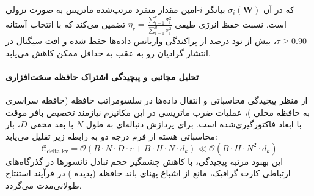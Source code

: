 که در آن $\sigma_i(\mathbf{W})$ بیانگر $i$-امین مقدار منفرد مرتب‌شده ماتریس به صورت نزولی است. نسبت حفظ انرژی طیفی $\eta_r = \frac{\sum_{i=1}^r \sigma_i^2}{\sum_{i=1}^{d} \sigma_i^2}$ تضمین می‌کند که با انتخاب آستانه $\tau \ge 0.90$، بیش از نود درصد از پراکندگی واریانس داده‌ها حفظ شده و افت سیگنال در انتشار گرادیان رو به عقب به حداقل ممکن کاهش می‌یابد.

\paragraph{تحلیل مجانبی و پیچیدگی اشتراک حافظه سخت‌افزاری}
از منظر پیچیدگی محاسباتی و انتقال داده‌ها در سلسومراتب حافظه (حافظه سراسری  به حافظه محلی )، عملیات ضرب ماتریسی در این مکانیزم نیازمند تخصیص بافر موقت با ابعاد فاکتورگیری‌شده است. برای پردازش دنباله‌ای به طول $N$ با بعد مخفی $D$، بار محاسباتی هسته از فرم درجه دو به رابطه زیر تقلیل می‌یابد:
\begin{equation}
\label{eq:complexity_delta_kv}
\mathcal{C}_{\text{delta\_kv}} = \mathcal{O}\left( B \cdot N \cdot D \cdot r + B \cdot H \cdot N \cdot d_k \right) \ll \mathcal{O}\left( B \cdot H \cdot N^2 \cdot d_k \right)
\end{equation}
این بهبود مرتبه پیچیدگی، با کاهش چشمگیر حجم تبادل تانسورها در گذرگاه‌های ارتباطی کارت گرافیک، مانع از اشباع پهنای باند حافظه (پدیده ) در فرآیند استنتاج طولانی‌مدت می‌گردد.
